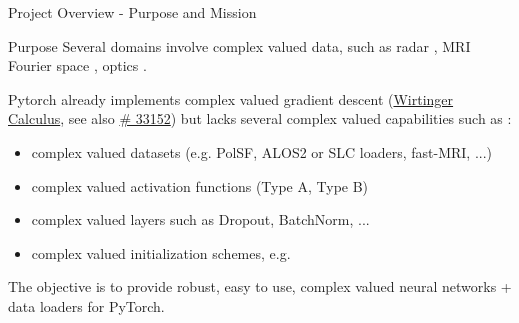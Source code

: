 \documentclass[aspectratio=169,10pt]{beamer}
\begin{document}
\begin{frame}{Project Overview - Purpose and Mission}


\begin{block}{Purpose}
\vspace{4pt}
Several domains involve complex valued data, such as radar \cite{Barrachina2022}, MRI Fourier space \cite{Solomon2024,Hemidi2023}, optics \cite{Dinsdale2021}.\\

\vspace{4pt}

Pytorch already implements complex valued gradient descent (\href{https://pytorch.org/docs/stable/notes/autograd.html#autograd-for-complex-numbers}{Wirtinger Calculus}, see also \href{https://github.com/pytorch/pytorch/issues/33152}{\# 33152}) but lacks several complex valued capabilities such as :

\begin{itemize}
\item complex valued datasets (e.g. PolSF, ALOS2 or SLC loaders, fast-MRI, ...)
\item complex valued activation functions (Type A, Type B) %
\item complex valued layers such as Dropout, BatchNorm, ...
\item complex valued initialization schemes, e.g. \cite{Trabelsi2018}
\end{itemize}

The objective is to provide robust, easy to use, complex valued neural networks + data loaders for PyTorch. 

\end{block}




\end{frame}
\end{document}

